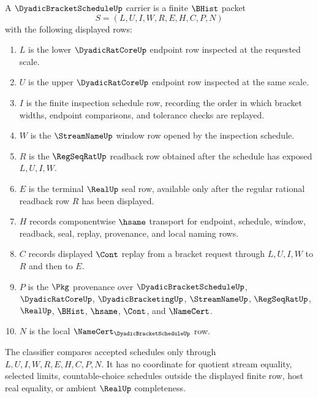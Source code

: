 \begin{definition}
\label{def:dyadic-bracket-schedule-carrier}
A $\DyadicBracketScheduleUp$ carrier is a finite $\BHist$ packet
$$
S=(L,U,I,W,R,E,H,C,P,N)
$$
with the following displayed rows:
\begin{enumerate}
\item $L$ is the lower $\DyadicRatCoreUp$ endpoint row inspected at the requested scale.
\item $U$ is the upper $\DyadicRatCoreUp$ endpoint row inspected at the same scale.
\item $I$ is the finite inspection schedule row, recording the order in which bracket widths, endpoint comparisons, and tolerance checks are replayed.
\item $W$ is the $\StreamNameUp$ window row opened by the inspection schedule.
\item $R$ is the $\RegSeqRatUp$ readback row obtained after the schedule has exposed $L,U,I,W$.
\item $E$ is the terminal $\RealUp$ seal row, available only after the regular rational readback row $R$ has been displayed.
\item $H$ records componentwise $\hsame$ transport for endpoint, schedule, window, readback, seal, replay, provenance, and local naming rows.
\item $C$ records displayed $\Cont$ replay from a bracket request through $L,U,I,W$ to $R$ and then to $E$.
\item $P$ is the $\Pkg$ provenance over $\DyadicBracketScheduleUp$, $\DyadicRatCoreUp$, $\DyadicBracketingUp$, $\StreamNameUp$, $\RegSeqRatUp$, $\RealUp$, $\BHist$, $\hsame$, $\Cont$, and $\NameCert$.
\item $N$ is the local $\NameCert_{\DyadicBracketScheduleUp}$ row.
\end{enumerate}
The classifier compares accepted schedules only through $L,U,I,W,R,E,H,C,P,N$. It has no coordinate for quotient stream equality, selected limits, countable-choice schedules outside the displayed finite row, host real equality, or ambient $\RealUp$ completeness.
\end{definition}

